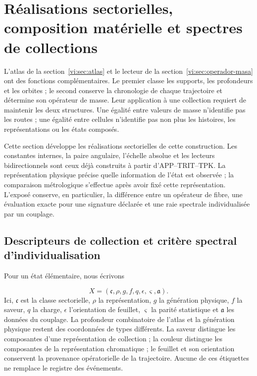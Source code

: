 \section{Réalisations sectorielles, composition matérielle et spectres de collections
}
\label{vi:sec:familias-compuestos}

L’atlas de la section~\ref{vi:sec:atlas} et le lecteur de la
section~\ref{vi:sec:operador-masa} ont des fonctions complémentaires. Le
premier classe les supports, les profondeurs et les orbites ; le second conserve la
chronologie de chaque trajectoire et détermine son opérateur de masse. Leur application
à une collection requiert de maintenir les deux structures. Une égalité entre
valeurs de masse n’identifie pas les routes ; une égalité entre cellules n’identifie pas non plus
les histoires, les représentations ou les états composés.


Cette section développe les réalisations sectorielles de cette
construction. Les constantes internes, la paire angulaire, l’échelle absolue
et les lecteurs bidirectionnels sont ceux déjà construits à partir
d’APP--TRIT--TPK. La représentation physique précise quelle information de
l’état est observée ; la comparaison métrologique s’effectue après avoir fixé
cette représentation. L’exposé conserve, en particulier, la différence
entre un opérateur de fibre, une évaluation exacte pour une signature déclarée
et une raie spectrale individualisée par un couplage.


\subsection{Descripteurs de collection et critère spectral d’individualisation
}
\label{vi:subsec:descriptor-familia}

Pour un état élémentaire, nous écrivons

\[
 X=(\mathfrak c,\rho,g,f,q,\epsilon,\varsigma,\mathfrak a).
\]
Ici, \(\mathfrak c\) est la classe sectorielle, \(\rho\) la représentation,
\(g\) la génération physique, \(f\) la saveur, \(q\) la charge,
\(\epsilon\) l’orientation de feuillet, \(\varsigma\) la parité statistique
et \(\mathfrak a\) les données du couplage. La profondeur combinatoire
de l’atlas et la génération physique restent des coordonnées de types
différents. La saveur distingue les composantes d’une représentation de
collection ; la couleur distingue les composantes de la représentation chromatique ;
le feuillet et son orientation conservent la provenance opératorielle de la
trajectoire. Aucune de ces étiquettes ne remplace le registre des événements.


